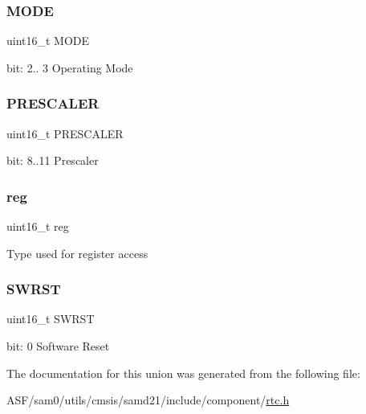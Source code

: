 \subsubsection{\texorpdfstring{MODE}{MODE}}
{\footnotesize\ttfamily uint16\+\_\+t M\+O\+DE}

bit\+: 2.. 3 Operating Mode \mbox{\label{union_r_t_c___m_o_d_e1___c_t_r_l___type_a30db59a1afd851a8a4acd5d8605ca6ba}} 
\subsubsection{\texorpdfstring{PRESCALER}{PRESCALER}}
{\footnotesize\ttfamily uint16\+\_\+t P\+R\+E\+S\+C\+A\+L\+ER}

bit\+: 8..11 Prescaler \mbox{\label{union_r_t_c___m_o_d_e1___c_t_r_l___type_a11760f5020019f4aa8cb02e694f7cc44}} 
\subsubsection{\texorpdfstring{reg}{reg}}
{\footnotesize\ttfamily uint16\+\_\+t reg}

Type used for register access \mbox{\label{union_r_t_c___m_o_d_e1___c_t_r_l___type_a4987fcca11694bd2ffae6a773a9bfc24}} 
\subsubsection{\texorpdfstring{SWRST}{SWRST}}
{\footnotesize\ttfamily uint16\+\_\+t S\+W\+R\+ST}

bit\+: 0 Software Reset 

The documentation for this union was generated from the following file\+:\begin{DoxyCompactItemize}
\item 
A\+S\+F/sam0/utils/cmsis/samd21/include/component/\mbox{\hyperlink{component_2rtc_8h}{rtc.\+h}}\end{DoxyCompactItemize}
